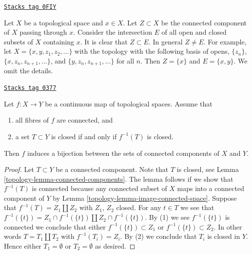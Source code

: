 \begin{remark}
\label{topology-remark-quasi-components}
\href{https://stacks.math.columbia.edu/tag/0FIY}{\texttt{Stacks tag 0FIY}}

\begin{reference}
\cite[Example 6.1.24]{Engelking}
\end{reference}
Let $X$ be a topological space and $x \in X$. Let $Z \subset X$ be the
connected component of $X$ passing through $x$. Consider the intersection
$E$ of all open and closed subsets of $X$ containing $x$. It is clear that
$Z \subset E$. In general $Z \not = E$. For example, let
$X = \{x, y, z_1, z_2, \ldots\}$ with the topology with the following
basis of opens, $\{z_n\}$, $\{x, z_n, z_{n + 1}, \ldots\}$, and
$\{y, z_n, z_{n + 1}, \ldots\}$ for all $n$. Then $Z = \{x\}$ and
$E = \{x, y\}$. We omit the details.
\end{remark}

\begin{lemma}
\label{topology-lemma-connected-fibres-quotient-topology-connected-components}
\href{https://stacks.math.columbia.edu/tag/0377}{\texttt{Stacks tag 0377}}

Let $f : X \to Y$ be a continuous map of topological spaces.
Assume that
\begin{enumerate}
\item all fibres of $f$ are connected, and
\item a set $T \subset Y$ is closed if and only if $f^{-1}(T)$ is closed.
\end{enumerate}
Then $f$ induces a bijection between the sets of connected
components of $X$ and $Y$.
\end{lemma}

\begin{proof}

Let $T \subset Y$ be a connected component.
Note that $T$ is closed, see Lemma \ref{topology-lemma-connected-components}.
The lemma follows if we show that $f^{-1}(T)$ is connected
because any connected subset of $X$ maps into a connected component
of $Y$ by Lemma \ref{topology-lemma-image-connected-space}.
Suppose that $f^{-1}(T) = Z_1 \amalg Z_2$
with $Z_1$, $Z_2$ closed. For any $t \in T$ we see that
$f^{-1}(\{t\}) = Z_1 \cap f^{-1}(\{t\}) \amalg Z_2 \cap f^{-1}(\{t\})$.
By (1) we see $f^{-1}(\{t\})$ is connected we conclude that
either $f^{-1}(\{t\}) \subset Z_1$ or $f^{-1}(\{t\}) \subset Z_2$.
In other words $T = T_1 \amalg T_2$ with $f^{-1}(T_i) = Z_i$.
By (2) we conclude that $T_i$ is closed in $Y$.
Hence either $T_1 = \emptyset$ or $T_2 = \emptyset$ as desired.
\end{proof}

